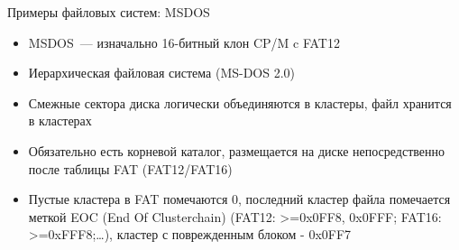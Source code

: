 \documentclass[aspectratio=169,14pt]{beamer}
\begin{document}
\begin{frame}{Примеры файловых систем: MSDOS}
    \begin{itemize}
        \item MSDOS~--- изначально 16-битный клон CP/M c FAT12
        \item Иерархическая файловая система (MS-DOS 2.0)
        \item Смежные сектора диска логически объединяются в кластеры, файл
        хранится в кластерах
        \item Обязательно есть корневой каталог, размещается на диске
        непосредственно после таблицы FAT (FAT12/FAT16)
        \item Пустые кластера в FAT помечаются 0, последний кластер файла
        помечается меткой EOC (End Of Clusterchain) (FAT12: >=0x0FF8, 0x0FFF;
        FAT16: >=0xFFF8;\ldots), кластер с поврежденным блоком - 0x0FF7
    \end{itemize}
\end{frame}
\end{document}
